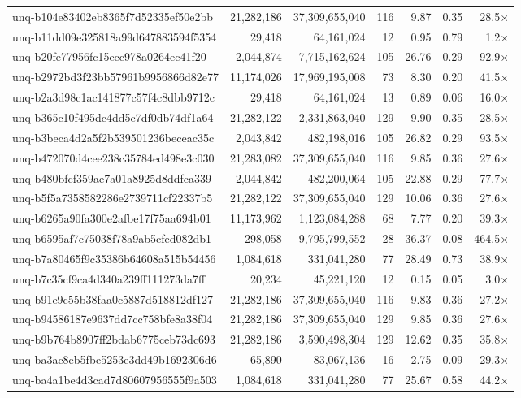 \begin{table}[h!]
\begin{tabular}{lrrrrrr}
unq-b104e83402eb8365f7d52335ef50e2bb & 21,282,186 & 37,309,655,040 & 116 & 9.87 & 0.35 & 28.5$\times$ \\
unq-b11dd09e325818a99d647883594f5354 & 29,418 & 64,161,024 & 12 & 0.95 & 0.79 & 1.2$\times$ \\
unq-b20fe77956fc15ecc978a0264ec41f20 & 2,044,874 & 7,715,162,624 & 105 & 26.76 & 0.29 & 92.9$\times$ \\
unq-b2972bd3f23bb57961b9956866d82e77 & 11,174,026 & 17,969,195,008 & 73 & 8.30 & 0.20 & 41.5$\times$ \\
unq-b2a3d98c1ac141877c57f4c8dbb9712c & 29,418 & 64,161,024 & 13 & 0.89 & 0.06 & 16.0$\times$ \\
unq-b365c10f495dc4dd5c7df0db74df1a64 & 21,282,122 & 2,331,863,040 & 129 & 9.90 & 0.35 & 28.5$\times$ \\
unq-b3beca4d2a5f2b539501236beceac35c & 2,043,842 & 482,198,016 & 105 & 26.82 & 0.29 & 93.5$\times$ \\
unq-b472070d4cee238c35784ed498e3c030 & 21,283,082 & 37,309,655,040 & 116 & 9.85 & 0.36 & 27.6$\times$ \\
unq-b480bfcf359ae7a01a8925d8ddfca339 & 2,044,842 & 482,200,064 & 105 & 22.88 & 0.29 & 77.7$\times$ \\
unq-b5f5a7358582286e2739711cf22337b5 & 21,282,122 & 37,309,655,040 & 129 & 10.06 & 0.36 & 27.6$\times$ \\
unq-b6265a90fa300e2afbe17f75aa694b01 & 11,173,962 & 1,123,084,288 & 68 & 7.77 & 0.20 & 39.3$\times$ \\
unq-b6595af7c75038f78a9ab5cfed082db1 & 298,058 & 9,795,799,552 & 28 & 36.37 & 0.08 & 464.5$\times$ \\
unq-b7a80465f9c35386b64608a515b54456 & 1,084,618 & 331,041,280 & 77 & 28.49 & 0.73 & 38.9$\times$ \\
unq-b7c35cf9ca4d340a239ff111273da7ff & 20,234 & 45,221,120 & 12 & 0.15 & 0.05 & 3.0$\times$ \\
unq-b91e9c55b38faa0c5887d518812df127 & 21,282,186 & 37,309,655,040 & 116 & 9.83 & 0.36 & 27.2$\times$ \\
unq-b94586187e9637dd7cc758bfe8a38f04 & 21,282,186 & 37,309,655,040 & 129 & 9.85 & 0.36 & 27.6$\times$ \\
unq-b9b764b8907ff2bdab6775ceb73dc693 & 21,282,186 & 3,590,498,304 & 129 & 12.62 & 0.35 & 35.8$\times$ \\
unq-ba3ac8eb5fbe5253e3dd49b1692306d6 & 65,890 & 83,067,136 & 16 & 2.75 & 0.09 & 29.3$\times$ \\
unq-ba4a1be4d3cad7d80607956555f9a503 & 1,084,618 & 331,041,280 & 77 & 25.67 & 0.58 & 44.2$\times$ \\

\end{tabular}
\end{table}
